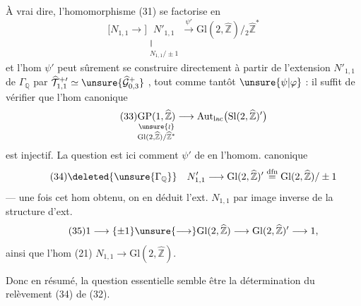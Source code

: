 

À vrai dire, l'homomorphisme (31) se factorise en
\[
\tag{32}
\bigl[N_{1,1}\longrightarrow\bigr]
\underset{\substack{\Vert\\N_{1,1}/\pm1}}{N'_{1,1}}
\xrightarrow{\psi'}\mathrm{Gl}(2,\widehat{\mathbb Z})/{}_{2}\widehat{\mathbb Z}^{*}
\]
et l'hom $\psi'$ peut sûrement se construire directement à partir de l'extension
$N'_{1,1}$ de $\Gamma_{\mathbb Q}$ par
$\widehat{\mathcal T}_{1,1}^{+\prime}\simeq\unsure{\widehat{\mathcal G}_{0,3}^{+}}$
, tout comme tantôt $\unsure{\psi|\varphi}$ :
il suffit de vérifier que l'hom canonique
\[
\tag{33}
\underset{\substack{\unsure{\wr}\\\mathrm{Gl}(2,\widehat{\mathbb Z})/\widehat{\mathbb Z}^{*}}}{\mathrm{GP}(1,\widehat{\mathbb Z})}
\longrightarrow\mathrm{Aut}_{\mathrm{lac}}\bigl(\mathrm{Sl}(2,\widehat{\mathbb Z})'\bigr)
\]
est  injectif. La question est ici
comment 
$\psi'$ de  en l'homom. canonique
\[
\tag{34}
\deleted{\unsure{\Gamma_{\mathbb Q}}}\quad
N'_{1,1}\longrightarrow\mathrm{Gl}(2,\widehat{\mathbb Z})'
\overset{\mathrm{dfn}}{=}\mathrm{Gl}(2,\widehat{\mathbb Z})/\pm1
\]
--- une fois cet hom obtenu, on en déduit l'ext. $N_{1,1}$ par image inverse
de la structure d'ext.
\[
\tag{35}
1\longrightarrow\{\pm1\}\unsure{\longrightarrow}\mathrm{Gl}(2,\widehat{\mathbb Z})
\longrightarrow\mathrm{Gl}(2,\widehat{\mathbb Z})'\longrightarrow1,
\]
ainsi que l'hom (21) $N_{1,1}\longrightarrow\mathrm{Gl}(2,\widehat{\mathbb Z})$.



Donc en résumé, la question essentielle semble être la détermination du relèvement (34) de (32).

